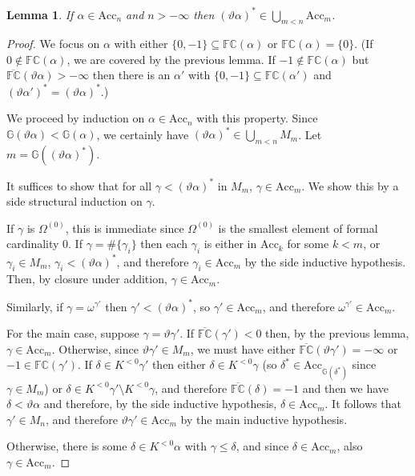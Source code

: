 \documentclass[11pt]{amsart}
\newtheorem{lemma}[theorem]{Lemma}
\theoremstyle{definition}
\begin{document}
\begin{lemma}
  If $\alpha\in\mathrm{Acc}_n$ and $n>-\infty$ then $(\vartheta\alpha)^*\in\bigcup_{m<n}\mathrm{Acc}_m$.
\end{lemma}
\begin{proof}
We focus on $\alpha$ with either $\{0,-1\}\subseteq\mathbb{FC}(\alpha)$ or $\mathbb{FC}(\alpha)=\{0\}$. (If $0\not\in\mathbb{FC}(\alpha)$, we are covered by the previous lemma. If $-1\not\in\mathbb{FC}(\alpha)$ but $\overline{\mathbb{FC}}(\vartheta\alpha)>-\infty$ then there is an $\alpha'$ with $\{0,-1\}\subseteq\mathbb{FC}(\alpha')$ and $(\vartheta\alpha')^*=(\vartheta\alpha)^*$.)

We proceed by induction on $\alpha\in\mathrm{Acc}_n$ with this property. Since $\mathbb{G}(\vartheta\alpha)<\mathbb{G}(\alpha)$, we certainly have $(\vartheta\alpha)^*\in\bigcup_{m<n}M_m$. Let $m=\mathbb{G}((\vartheta\alpha)^*)$.
  
  It suffices to show that for all $\gamma<(\vartheta\alpha)^*$ in $M_m$, $\gamma\in\mathrm{Acc}_m$. We show this by a side structural induction on $\gamma$.

  If $\gamma$ is $\Omega^{(0)}$, this is immediate since $\Omega^{(0)}$ is the smallest element of formal cardinality $0$. If $\gamma=\#\{\gamma_i\}$ then each $\gamma_i$ is either in $\mathrm{Acc}_k$ for some $k<m$, or $\gamma_i\in M_m$, $\gamma_i<(\vartheta\alpha)^*$, and therefore $\gamma_i\in\mathrm{Acc}_m$ by the side inductive hypothesis. Then, by closure under addition, $\gamma\in\mathrm{Acc}_m$.

  Similarly, if $\gamma=\omega^{\gamma'}$ then $\gamma'<(\vartheta\alpha)^*$, so $\gamma'\in\mathrm{Acc}_m$, and therefore $\omega^{\gamma'}\in\mathrm{Acc}_m$.

  For the main case, suppose $\gamma=\vartheta\gamma'$. If $\overline{\mathbb{FC}}(\gamma')<0$ then, by the previous lemma, $\gamma\in\mathrm{Acc}_m$. Otherwise, since $\vartheta\gamma'\in M_m$, we must have either $\overline{\mathbb{FC}}(\vartheta\gamma')=-\infty$ or $-1\in \mathbb{FC}(\gamma')$. If $\delta\in K^{< 0}\gamma'$ then either $\delta\in K^{< 0}\gamma$ (so $\delta^*\in\mathrm{Acc}_{\mathbb{G}(\delta^*)}$ since $\gamma\in M_m$) or $\delta\in K^{< 0}\gamma'\setminus K^{< 0}\gamma$, and therefore $\overline{\mathbb{FC}}(\delta)=-1$ and then we have $\delta<\vartheta\alpha$ and therefore, by the side inductive hypothesis, $\delta\in\mathrm{Acc}_m$. It follows that $\gamma'\in M_n$, and therefore $\vartheta\gamma'\in\mathrm{Acc}_m$ by the main inductive hypothesis.%
  
  Otherwise, there is some $\delta\in K^{< 0}\alpha$ with $\gamma\leq\delta$, and since $\delta\in\mathrm{Acc}_m$, also $\gamma\in\mathrm{Acc}_m$.
\end{proof}
\end{document}
